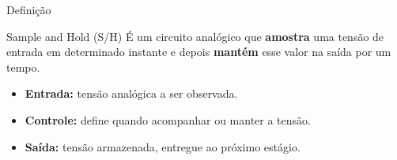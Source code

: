 \begin{frame}{Definição}
  \begin{block}{Sample and Hold (S/H)}
    É um circuito analógico que \textbf{amostra} uma tensão de entrada em determinado instante e depois \textbf{mantém} esse valor na saída por um tempo.
  \end{block}

  \begin{center}
  \end{center}

  \begin{itemize}
    \item \textbf{Entrada:} tensão analógica a ser observada.
    \item \textbf{Controle:} define quando acompanhar ou manter a tensão.
    \item \textbf{Saída:} tensão armazenada, entregue ao próximo estágio.
  \end{itemize}
\end{frame}
